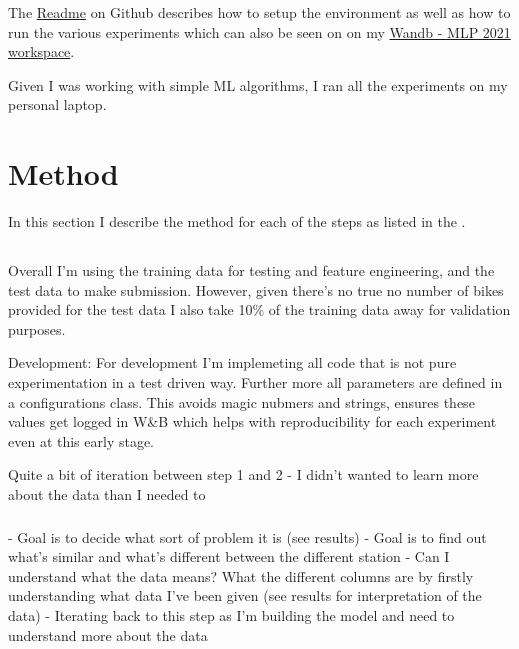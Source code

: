 \documentclass{article}
\begin{document}
    The \href{https://github.com/isabelladegen/mlp-2021}{Readme} on Github describes how to setup the environment as well
    as how to run the various experiments which can also be seen on on my \href{https://wandb.ai/idegen/mlp-2021}{Wandb - MLP 2021 workspace}.

    Given I was working with simple ML algorithms, I ran all the experiments on my personal laptop.


    \section{Method}\label{sec:method}

    In this section I describe the method for each of the steps as listed in the .

    \subsection*{}

    Overall I'm using the training data for testing and feature engineering, and the test data to make submission.
    However, given there's no true no number of bikes provided for the test data I also take 10\% of the training data away
    for validation purposes.

    Development:
    For development I'm implemeting all code that is not pure experimentation in a test driven way. Further more all parameters are defined in a configurations class. This avoids magic nubmers and
    strings, ensures these values get logged in W&B which helps with reproducibility for each experiment even at this early stage.

    Quite a bit of iteration between step 1 and 2 - I didn't wanted to learn more about the data than I needed to

    \subsubsection*{}
    - Goal is to decide what sort of problem it is (see results)
    - Goal is to find out what's similar and what's different between the different station
    - Can I understand what the data means? What the different columns are by firstly understanding what data I've been given
    (see results for interpretation of the data)
    - Iterating back to this step as I'm building the model and need to understand more about the data
\end{document}
